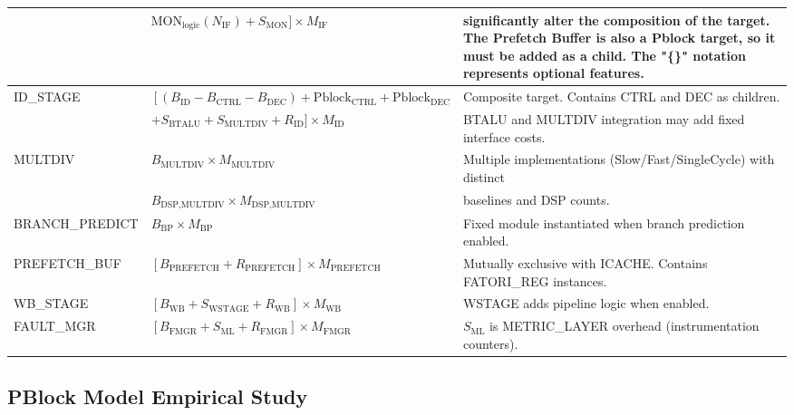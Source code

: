 \begin{table}[htbp]
\begin{tabularx}{\linewidth}{@{}lp{6cm}X@{}}
& $ \text{MON}_{\text{logic}}(N_{\text{IF}}) + S_{\text{MON}}] \times M_{\text{IF}}$ & significantly alter the composition of the target. The Prefetch Buffer is also a Pblock target, so it must be added as a child. The "\{\}" notation represents optional features. \\
\midrule
ID\_STAGE & $\left[ (B_{\text{ID}} - B_{\text{CTRL}} - B_{\text{DEC}}) + \text{Pblock}_{\text{CTRL}} + \text{Pblock}_{\text{DEC}} \right.$ & Composite target. Contains CTRL and DEC as children. \\
 & $+ S_{\text{BTALU}} + S_{\text{MULTDIV}} + R_{\text{ID}}] \times M_{\text{ID}}$ & BTALU and MULTDIV integration may add fixed interface costs.\\
\midrule
MULTDIV & $B_{\text{MULTDIV}} \times M_{\text{MULTDIV}}$ & Multiple implementations (Slow/Fast/SingleCycle) with distinct \\ & $B_{\text{DSP,MULTDIV}} \times M_{\text{DSP,MULTDIV}}$ & baselines and DSP counts. \\
\midrule
BRANCH\_PREDICT & $B_{\text{BP}} \times M_{\text{BP}}$ & Fixed module instantiated when branch prediction enabled. \\
\midrule
PREFETCH\_BUF & $\left[ B_{\text{PREFETCH}} + R_{\text{PREFETCH}} \right] \times M_{\text{PREFETCH}}$ & Mutually exclusive with ICACHE. Contains FATORI\_REG instances. \\
\midrule
WB\_STAGE & $\left[ B_{\text{WB}} + S_{\text{WSTAGE}} + R_{\text{WB}} \right] \times M_{\text{WB}}$ & WSTAGE adds pipeline logic when enabled. \\
\midrule
FAULT\_MGR & $\left[ B_{\text{FMGR}} + S_{\text{ML}} + R_{\text{FMGR}} \right] \times M_{\text{FMGR}}$ & $S_{\text{ML}}$ is METRIC\_LAYER overhead (instrumentation counters). \\
\bottomrule
\end{tabularx}
\end{table}


\subsection{PBlock Model Empirical Study}
\label{chap7:pblock_study}

